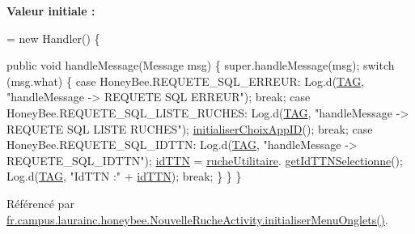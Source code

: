 {\bfseries Valeur initiale \+:}
\begin{DoxyCode}
= \textcolor{keyword}{new} Handler()
    \{
        
        \textcolor{keyword}{public} \textcolor{keywordtype}{void} handleMessage(Message msg)
        \{
            super.handleMessage(msg);
            \textcolor{keywordflow}{switch} (msg.what)
            \{
                \textcolor{keywordflow}{case} HoneyBee.REQUETE\_SQL\_ERREUR:
                    Log.d(\hyperlink{classfr_1_1campus_1_1laurainc_1_1honeybee_1_1_nouvelle_ruche_activity_afa1372bcc0387e18df3877ebe605670d}{TAG}, \textcolor{stringliteral}{"handleMessage -> REQUETE SQL ERREUR"});
                    \textcolor{keywordflow}{break};
                \textcolor{keywordflow}{case} HoneyBee.REQUETE\_SQL\_LISTE\_RUCHES:
                    Log.d(\hyperlink{classfr_1_1campus_1_1laurainc_1_1honeybee_1_1_nouvelle_ruche_activity_afa1372bcc0387e18df3877ebe605670d}{TAG}, \textcolor{stringliteral}{"handleMessage -> REQUETE SQL LISTE RUCHES"});
                    \hyperlink{classfr_1_1campus_1_1laurainc_1_1honeybee_1_1_nouvelle_ruche_activity_a25bf91899b217681bda733e7783d0bf9}{initialiserChoixAppID}();
                    \textcolor{keywordflow}{break};
                \textcolor{keywordflow}{case} HoneyBee.REQUETE\_SQL\_IDTTN:
                    Log.d(\hyperlink{classfr_1_1campus_1_1laurainc_1_1honeybee_1_1_nouvelle_ruche_activity_afa1372bcc0387e18df3877ebe605670d}{TAG}, \textcolor{stringliteral}{"handleMessage -> REQUETE\_SQL\_IDTTN"});
                    \hyperlink{classfr_1_1campus_1_1laurainc_1_1honeybee_1_1_nouvelle_ruche_activity_a0e39429b741638b151aec8960b76b0e1}{idTTN} = \hyperlink{classfr_1_1campus_1_1laurainc_1_1honeybee_1_1_nouvelle_ruche_activity_adad53c25187f84fd37af3d2de167529e}{rucheUtilitaire}.
      \hyperlink{classfr_1_1campus_1_1laurainc_1_1honeybee_1_1_ruche_a8c4c0db39c42733517035c4211e0ff95}{getIdTTNSelectionne}();
                    Log.d(\hyperlink{classfr_1_1campus_1_1laurainc_1_1honeybee_1_1_nouvelle_ruche_activity_afa1372bcc0387e18df3877ebe605670d}{TAG}, \textcolor{stringliteral}{"IdTTN :"} + \hyperlink{classfr_1_1campus_1_1laurainc_1_1honeybee_1_1_nouvelle_ruche_activity_a0e39429b741638b151aec8960b76b0e1}{idTTN});
                    \textcolor{keywordflow}{break};
            \}
        \}
    \}
\end{DoxyCode}


Référencé par \hyperlink{classfr_1_1campus_1_1laurainc_1_1honeybee_1_1_nouvelle_ruche_activity_ad9bdfb01df8d7402b4da9858f263e1fd}{fr.\+campus.\+laurainc.\+honeybee.\+Nouvelle\+Ruche\+Activity.\+initialiser\+Menu\+Onglets()}.

